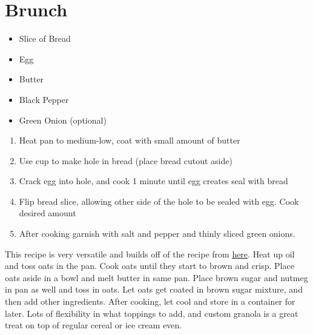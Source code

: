 \documentclass[oneside]{recipe}
\begin{document}
\chapter{Brunch}
\begin{multicols}{2}
\raggedcolumns
\begin{itemize}
\item Slice of Bread
\item Egg
\item Butter
\item Black Pepper
\item Green Onion (optional)
\end{itemize}
\columnbreak
\begin{enumerate}
	\item Heat pan to medium-low, coat with small amount of butter
	\item Use cup to make hole in bread (place bread cutout aside)
	\item Crack egg into hole, and cook 1 minute until egg creates seal with bread
	\item Flip bread slice, allowing other side of the hole to be sealed with egg. Cook desired amount
	\item After cooking garnish with salt and pepper and thinly sliced green onions.
\end{enumerate}
\end{multicols}


This recipe is very versatile and builds off of the recipe from \href{http://allrecipes.com/recipe/stovetop-granola/}{\underline{here}}. Heat up oil and toss oats in the pan. Cook oats until they start to brown and crisp. Place oats aside in a bowl and melt butter in same pan. Place brown sugar and nutmeg in pan as well and toss in oats. Let oats get coated in brown sugar mixture, and then add other ingredients. After cooking, let cool and store in a container for later. Lots of flexibility in what toppings to add, and custom granola is a great treat on top of regular cereal or ice cream even.

\end{document}
